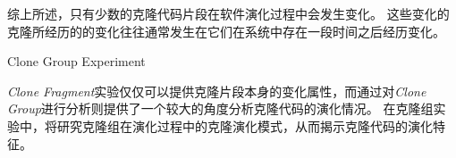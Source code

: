 
综上所述，只有少数的克隆代码片段在软件演化过程中会发生变化。 这些变化的克隆所经历的的变化往往通常发生在它们在系统中存在一段时间之后经历变化。

{Clone Group Experiment} 

{\em Clone Fragment}实验仅仅可以提供克隆片段本身的变化属性，而通过对{\em Clone Group}进行分析则提供了一个较大的角度分析克隆代码的演化情况。 %
在克隆组实验中，将研究克隆组在演化过程中的克隆演化模式，从而揭示克隆代码的演化特征。

